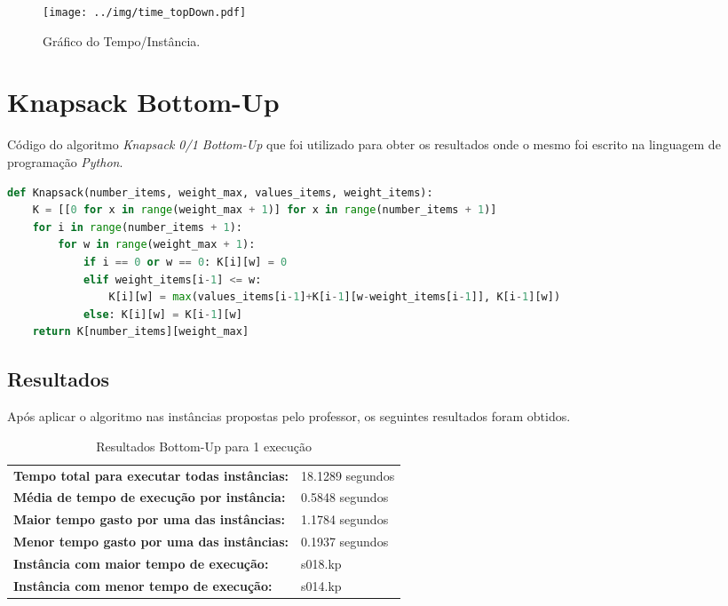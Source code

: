\documentclass[a4paper, 12pt]{article}
\begin{document}
\begin{figure}[!htb]
    \centering
    \texttt{[image: ../img/time\_topDown.pdf]}
    \caption{Gráfico do Tempo/Instância.}
    \label{fig:time_topDown}
\end{figure}

\clearpage
\section{Knapsack Bottom-Up}\label{sec:bottomup}
Código do algoritmo {\it Knapsack 0/1 Bottom-Up} que foi utilizado para obter os resultados onde o mesmo foi escrito
na linguagem de programação {\it Python}.\\
\begin{lstlisting}[language=Python, caption=Bottom-Up, label=alg:bottomup]
def Knapsack(number_items, weight_max, values_items, weight_items): 
    K = [[0 for x in range(weight_max + 1)] for x in range(number_items + 1)]
    for i in range(number_items + 1): 
        for w in range(weight_max + 1): 
            if i == 0 or w == 0: K[i][w] = 0
            elif weight_items[i-1] <= w: 
                K[i][w] = max(values_items[i-1]+K[i-1][w-weight_items[i-1]], K[i-1][w]) 
            else: K[i][w] = K[i-1][w] 
    return K[number_items][weight_max]
\end{lstlisting}

\subsection{Resultados}

Após aplicar o algoritmo  nas instâncias propostas pelo professor, os seguintes resultados
foram obtidos.
\begin{table}[!htb]
    \begin{tabular}{ll}
    \textbf{Tempo total para executar todas instâncias:} & 18.1289 segundos \\
    \textbf{Média de tempo de execução por instância:} & 0.5848 segundos \\
    \textbf{Maior tempo gasto por uma das instâncias:} & 1.1784 segundos \\
    \textbf{Menor tempo gasto por uma das instâncias:} & 0.1937 segundos \\
    \textbf{Instância com maior tempo de execução:} & s018.kp \\
    \textbf{Instância com menor tempo de execução:} & s014.kp
    \end{tabular}
    \caption{Resultados Bottom-Up para 1 execução}
    \label{tab:bottomup_exec}
\end{table}
\end{document}
